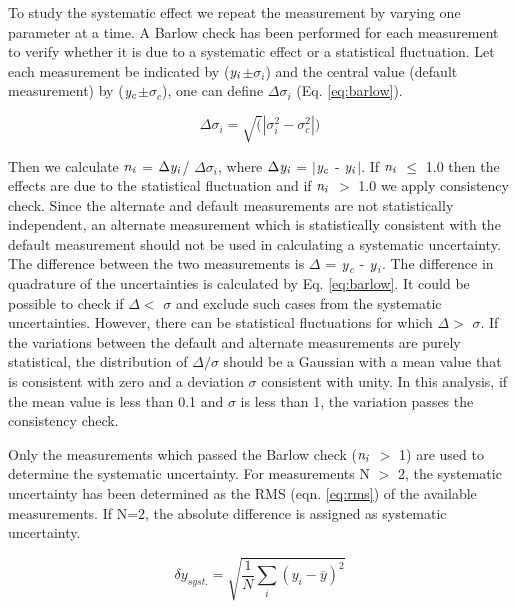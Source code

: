 To study the systematic effect we repeat the measurement by varying one parameter at a time. 
A Barlow \cite{cite:Barlow} check has been performed for each measurement to verify whether it is due to a systematic effect or a statistical fluctuation. Let each measurement be indicated by ($\it{y}_{i}$$\pm$$\sigma_{i}$) and the central value (default measurement) by ($\it{y}_{c}$$\pm$$\sigma_{c}$), one can define $\Delta\sigma_{i}$ (Eq. \ref{eq:barlow}).


\begin{equation}
 \Delta\sigma_{i} = \sqrt(|\sigma_{i}^{2} - \sigma_{c}^{2}|)
 \label {eq:barlow}
\end{equation}

Then we calculate $\it{n}_{i}$ = $\Delta\it{y}_{i}$/ $\Delta\sigma_{i}$, where  $\Delta\it{y}_{i}$ = $|$$\it{y}_{c}$ - $\it{y}_{i}$$|$.
If $\it{n}_{i}$ $\leq$ 1.0 then the effects are due to the statistical fluctuation and if $\it{n}_{i}$ $>$ 1.0 we apply consistency check. Since the alternate and default measurements are not statistically independent, an alternate measurement which is statistically consistent with the default measurement should not be used in calculating a systematic uncertainty. The difference between the two measurements is $\Delta$ = $\it{y}$$_{c}$ - $\it{y}$$_{i}$. The difference in quadrature of the uncertainties is calculated by Eq. \ref{eq:barlow}. 
It could be possible to check if $\Delta$$<$ $\sigma$ and exclude such cases from the systematic uncertainties. However, there can be statistical fluctuations for which $\Delta$$>$ $\sigma$. If the variations between the default and alternate measurements are purely statistical, the distribution of $\Delta$$/$$\sigma$ should be a Gaussian with a mean value that is consistent with zero and a deviation $\sigma$ consistent with unity. In this analysis, if the mean value is less than 0.1 and $\sigma$ is less than 1, the variation passes the consistency check.

Only the measurements which passed the Barlow check ($\it{n}_{i}$ $>$ 1) are used to determine the systematic uncertainty. For measurements N $>$ 2, the systematic uncertainty has been determined as the RMS (eqn. \ref{eq:rms}) of the available measurements. If N=2, the absolute difference is assigned as systematic uncertainty.

\begin{equation}
\delta y_{syst.}=\sqrt{\frac{1}{N}\sum_{i}(y_{i}-\overline{y})^{2}}
\label{eq:rms}
\end{equation}

